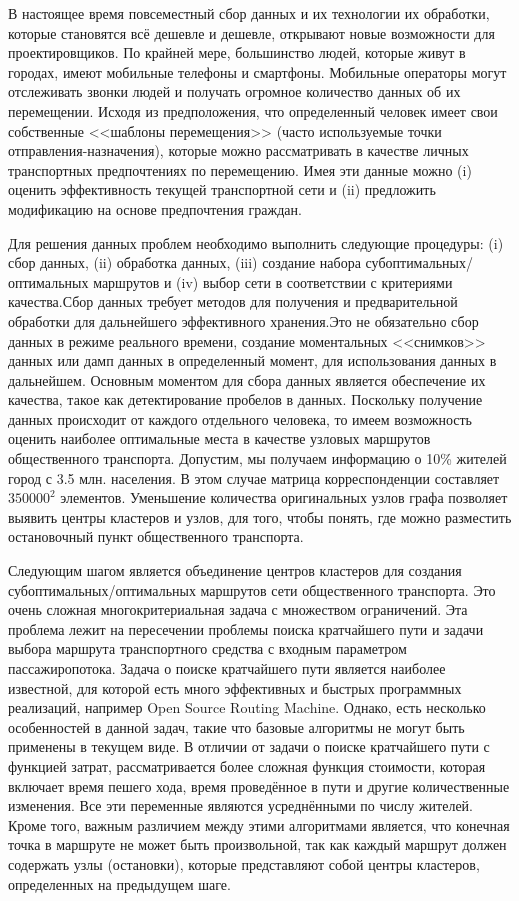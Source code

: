 В настоящее время повсеместный сбор данных и их технологии их обработки, которые становятся всё дешевле и 
дешевле, открывают новые возможности для проектировщиков. По крайней мере, большинство людей, которые 
живут в городах, имеют мобильные телефоны и смартфоны. Мобильные операторы могут отслеживать звонки людей 
и получать огромное количество данных об их перемещении. Исходя из предположения, что определенный человек 
имеет свои собственные <<шаблоны перемещения>> (часто используемые точки отправления-назначения), которые 
можно рассматривать в качестве личных транспортных предпочтениях по перемещению. Имея эти данные можно (i) 
оценить эффективность текущей транспортной сети и (ii) предложить модификацию на основе предпочтения 
граждан.

Для решения данных проблем необходимо выполнить следующие процедуры: (i) сбор данных, (ii) обработка данных, 
(iii) создание набора субоптимальных/оптимальных маршрутов и (iv) выбор сети в соответствии с критериями 
качества.Сбор данных требует методов для получения и предварительной обработки для дальнейшего эффективного 
хранения.Это не обязательно сбор данных в режиме реального времени, создание моментальных <<снимков>> данных 
или дамп данных в определенный момент, для использования данных в дальнейшем. Основным моментом для сбора 
данных является обеспечение их качества, такое как детектирование пробелов в данных. Поскольку получение 
данных происходит от каждого отдельного человека, то имеем возможность оценить наиболее оптимальные места в 
качестве узловых маршрутов общественного транспорта. Допустим, мы получаем информацию о 10\% жителей город 
с 3.5 млн. населения. В этом случае матрица корреспонденции составляет \( 350 000^2 \) элементов. Уменьшение 
количества оригинальных узлов графа позволяет выявить центры кластеров и узлов, для того, чтобы понять, где 
можно разместить остановочный пункт общественного транспорта.

Следующим шагом является объединение центров кластеров для создания субоптимальных/оптимальных маршрутов сети 
общественного транспорта. Это очень сложная многокритериальная задача с множеством ограничений. Эта проблема 
лежит на пересечении проблемы поиска кратчайшего пути и задачи выбора маршрута транспортного средства с 
входным параметром пассажиропотока. Задача о поиске кратчайшего пути является наиболее известной, для которой 
есть много эффективных и быстрых программных реализаций, например Open Source Routing Machine\cite{osrm}. 
Однако, есть несколько особенностей в данной задач, такие что базовые алгоритмы не могут быть применены в 
текущем виде. В отличии от задачи о поиске кратчайшего пути с функцией затрат, рассматривается более сложная 
функция стоимости, которая включает время пешего хода, время проведённое в пути и другие количественные 
изменения. Все эти переменные являются усреднёнными по числу жителей. Кроме того, важным различием между этими 
алгоритмами является, что конечная точка в маршруте не может быть произвольной, так как каждый маршрут должен 
содержать узлы (остановки), которые представляют собой центры кластеров, определенных на предыдущем шаге.

